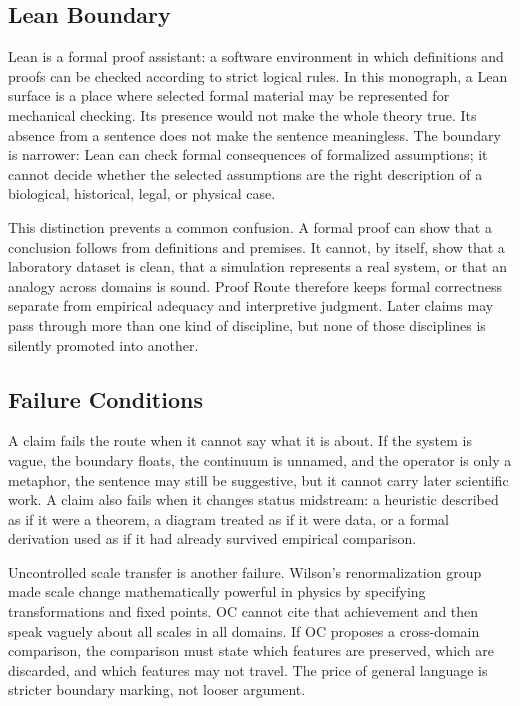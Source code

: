 \documentclass[11pt,a4paper,openany]{book}
\begin{document}
\subsection{Lean Boundary}
Lean is a formal proof assistant: a software environment in which definitions and proofs can be checked according to strict logical rules. In this monograph, a Lean surface is a place where selected formal material may be represented for mechanical checking. Its presence would not make the whole theory true. Its absence from a sentence does not make the sentence meaningless. The boundary is narrower: Lean can check formal consequences of formalized assumptions; it cannot decide whether the selected assumptions are the right description of a biological, historical, legal, or physical case. \cite{goldenfeld_lectures,kadanoff_scaling}\par
This distinction prevents a common confusion. A formal proof can show that a conclusion follows from definitions and premises. It cannot, by itself, show that a laboratory dataset is clean, that a simulation represents a real system, or that an analogy across domains is sound. Proof Route therefore keeps formal correctness separate from empirical adequacy and interpretive judgment. Later claims may pass through more than one kind of discipline, but none of those disciplines is silently promoted into another.\par
\subsection{Failure Conditions}
A claim fails the route when it cannot say what it is about. If the system is vague, the boundary floats, the continuum is unnamed, and the operator is only a metaphor, the sentence may still be suggestive, but it cannot carry later scientific work. A claim also fails when it changes status midstream: a heuristic described as if it were a theorem, a diagram treated as if it were data, or a formal derivation used as if it had already survived empirical comparison. \cite{goldenfeld_lectures,kadanoff_scaling}\par
Uncontrolled scale transfer is another failure. Wilson's renormalization group made scale change mathematically powerful in physics by specifying transformations and fixed points. OC cannot cite that achievement and then speak vaguely about all scales in all domains. If OC proposes a cross-domain comparison, the comparison must state which features are preserved, which are discarded, and which features may not travel. The price of general language is stricter boundary marking, not looser argument.\par
\end{document}
